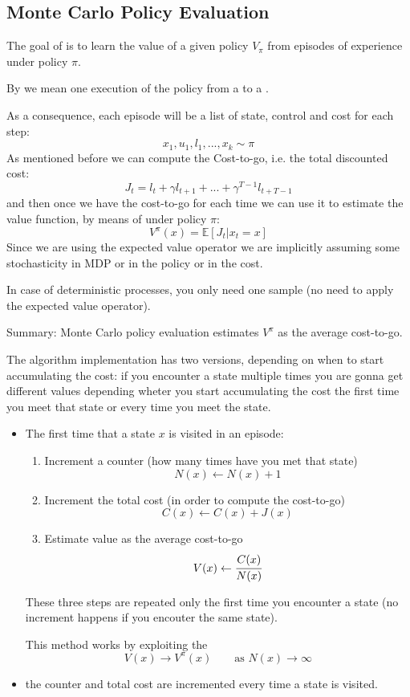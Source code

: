 \subsection{Monte Carlo Policy Evaluation}
The goal of  is to learn the value of a given policy $V_{\pi}$ from episodes of experience under policy $\pi$.

By  we mean one execution of the policy from a  to a .

As a consequence, each episode will be a list of state, control and cost for each step:
\[x_1, u_1, l_1 , ... , x_k \sim \pi\]
As mentioned before we can compute the Cost-to-go, i.e. the total discounted cost:
\[J_t = l_t + \gamma l_{t+1} + ... + \gamma^{T-1} l_{t + T-1}\]
and then once we have the cost-to-go for each time we can use it to estimate the value function, by means of  under policy $\pi$:
\[V^{\pi}(x) = \mathbb{E}[J_t | x_t = x]\]
Since we are using the expected value operator we are implicitly assuming some stochasticity in MDP or in the policy or in the cost.

In case of deterministic processes, you only need one sample (no need to apply the expected value operator).

Summary:
Monte Carlo policy evaluation estimates $V^{\pi}$ as the average cost-to-go.

The algorithm implementation has two versions, depending on when to start accumulating the cost: if you encounter a state multiple times you are gonna get different values depending wheter you start accumulating the cost the first time you meet that state or every time you meet the state.
\begin{itemize}
\item {}

The first time that a state $x$ is visited in an episode:
\begin{enumerate}
\item Increment a counter (how many times have you met that state)
\[N(x) \leftarrow N(x) + 1\]
\item Increment the total cost (in order to compute the cost-to-go)
\[C(x)\leftarrow C(x) + J(x)\]
\item Estimate value as the average cost-to-go
\[V(x) \leftarrow \cfrac{C(x)}{N(x)}\]
\end{enumerate}
These three steps are repeated only the first time you encounter a state (no increment happens if you encouter the same state).

This method works by exploiting the 
\[V(x)\rightarrow V^{\pi}(x)\qquad\text{as }N(x)\rightarrow\infty\]
\item {} 

the counter and total cost are incremented every time a state is visited.
\end{itemize}

